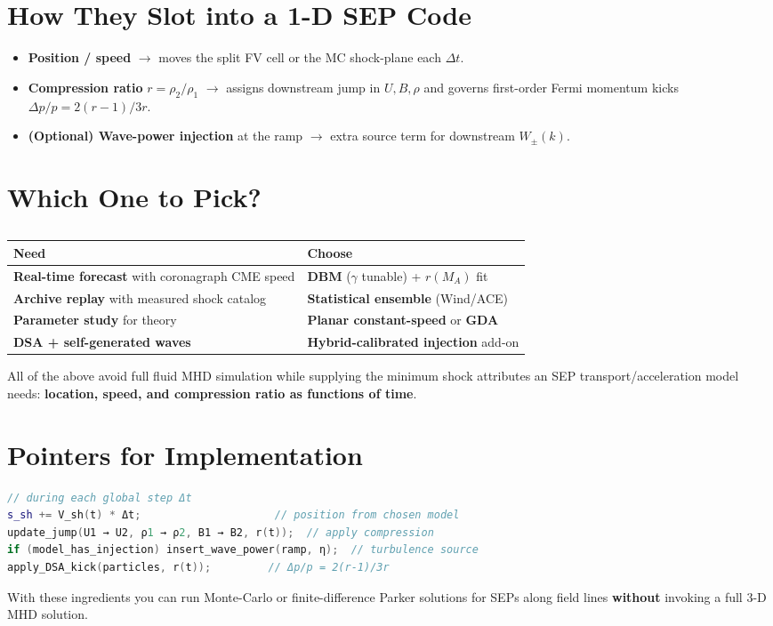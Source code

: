 \section*{How They Slot into a 1-D SEP Code}

\begin{itemize}
\item \textbf{Position / speed} $\rightarrow$ moves the split FV cell or the MC shock-plane each $\Delta t$.
\item \textbf{Compression ratio} $r = \rho_2/\rho_1$ $\rightarrow$ assigns downstream jump in $U, B, \rho$ and governs first-order Fermi momentum kicks $\Delta p/p = 2(r-1)/3r$.
\item \textbf{(Optional) Wave-power injection} at the ramp $\rightarrow$ extra source term for downstream $W_\pm(k)$.
\end{itemize}

\section*{Which One to Pick?}

\begin{table}[h!]
\centering
\begin{tabular}{|p{7cm}|p{6.5cm}|}
\hline
\textbf{Need} & \textbf{Choose} \\
\hline
\textbf{Real-time forecast} with coronagraph CME speed & \textbf{DBM} ($\gamma$ tunable) + $r(M_A)$ fit \\
\hline
\textbf{Archive replay} with measured shock catalog & \textbf{Statistical ensemble} (Wind/ACE) \\
\hline
\textbf{Parameter study} for theory & \textbf{Planar constant-speed} or \textbf{GDA} \\
\hline
\textbf{DSA + self-generated waves} & \textbf{Hybrid-calibrated injection} add-on \\
\hline
\end{tabular}
\caption*{}
\end{table}

\noindent All of the above avoid full fluid MHD simulation while supplying the minimum shock attributes an SEP transport/acceleration model needs: \textbf{location, speed, and compression ratio as functions of time}.

\section*{Pointers for Implementation}

\begin{lstlisting}[language=C++, basicstyle=\ttfamily\small]
// during each global step Δt
s_sh += V_sh(t) * Δt;                     // position from chosen model
update_jump(U1 → U2, ρ1 → ρ2, B1 → B2, r(t));  // apply compression
if (model_has_injection) insert_wave_power(ramp, η);  // turbulence source
apply_DSA_kick(particles, r(t));         // Δp/p = 2(r-1)/3r
\end{lstlisting}

\noindent With these ingredients you can run Monte-Carlo or finite-difference Parker solutions for SEPs along field lines \textbf{without} invoking a full 3-D MHD solution.
